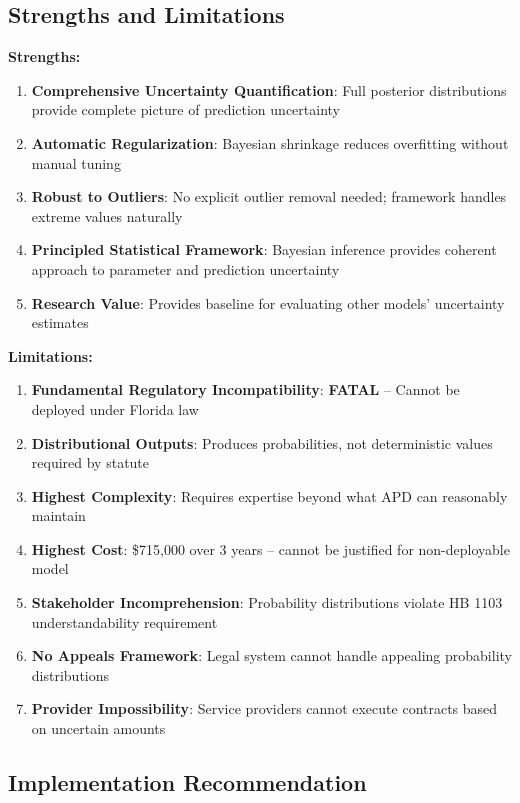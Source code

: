 \subsection{Strengths and Limitations}

\textbf{Strengths:}
\begin{enumerate}
    \item \textbf{Comprehensive Uncertainty Quantification}: Full posterior distributions provide complete picture of prediction uncertainty
    \item \textbf{Automatic Regularization}: Bayesian shrinkage reduces overfitting without manual tuning
    \item \textbf{Robust to Outliers}: No explicit outlier removal needed; framework handles extreme values naturally
    \item \textbf{Principled Statistical Framework}: Bayesian inference provides coherent approach to parameter and prediction uncertainty
    \item \textbf{Research Value}: Provides baseline for evaluating other models' uncertainty estimates
\end{enumerate}

\textbf{Limitations:}
\begin{enumerate}
    \item \textbf{Fundamental Regulatory Incompatibility}: \textbf{FATAL} -- Cannot be deployed under Florida law
    \item \textbf{Distributional Outputs}: Produces probabilities, not deterministic values required by statute
    \item \textbf{Highest Complexity}: Requires expertise beyond what APD can reasonably maintain
    \item \textbf{Highest Cost}: \$715,000 over 3 years -- cannot be justified for non-deployable model
    \item \textbf{Stakeholder Incomprehension}: Probability distributions violate HB 1103 understandability requirement
    \item \textbf{No Appeals Framework}: Legal system cannot handle appealing probability distributions
    \item \textbf{Provider Impossibility}: Service providers cannot execute contracts based on uncertain amounts
\end{enumerate}

\subsection{Implementation Recommendation}

